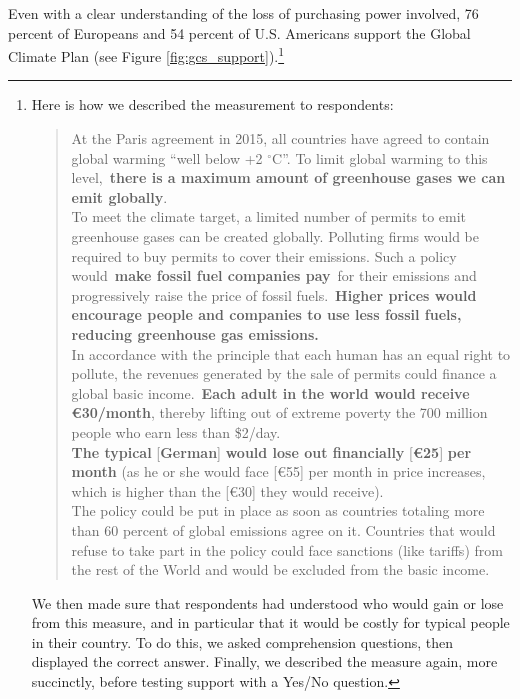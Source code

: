 \documentclass[a5paper,english,openany]{memoir}
\begin{document}
Even with a clear understanding of the loss of purchasing power involved, 76 percent of Europeans and 54 percent of U.S. Americans support the Global Climate Plan (see Figure \ref{fig:gcs_support}).\footnote{\label{fn15}
Here is how we described the measurement to respondents:
\begin{quote}
At the Paris agreement in 2015, all countries have agreed to contain global warming ``well below +2 $\mathrm{{}^\circ}$C''. To limit global warming to this level,~\textbf{there is a maximum amount of greenhouse gases we can emit globally}.\\
To meet the climate target, a limited number of permits to emit greenhouse gases can be created globally. Polluting firms would be required to buy permits to cover their emissions. Such a policy would~\textbf{make fossil fuel companies pay}~for their emissions and progressively raise the price of fossil fuels.~\textbf{Higher prices would encourage people and companies to use less fossil fuels, reducing greenhouse gas emissions.}\\
In accordance with the principle that each human has an equal right to pollute, the revenues generated by the sale of permits could finance a global basic income.~\textbf{Each adult in the world would receive } \textbf{\euro{}30/month}, thereby lifting out of extreme poverty the 700 million people who earn less than \$2/day.\\
\textbf{The typical }[\textbf{German}]\textbf{ would lose out financially }[\textbf{\euro{}25}]\textbf{ per month}\footnotemark{\label{fn16}} (as he or she would face [\euro{}55] per month in price increases, which is higher than the [\euro{}30] they would receive). 
\\The policy could be put in place as soon as countries totaling more than 60 percent of global emissions agree on it. Countries that would refuse to take part in the policy could face sanctions (like tariffs) from the rest of the World and would be excluded from the basic income.
\end{quote}
We then made sure that respondents had understood who would gain or lose from this measure, and in particular that it would be costly for typical people in their country. To do this, we asked comprehension questions, then displayed the correct answer. Finally, we described the measure again, more succinctly, before testing support with a Yes/No question.} 
\end{document}
